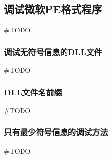 \subsection{调试微软PE格式程序}

\#TODO

\subsubsection{调试无符号信息的DLL文件}
\#TODO

\subsubsection{DLL文件名前缀}
\#TODO

\subsubsection{只有最少符号信息的调试方法}
\#TODO
